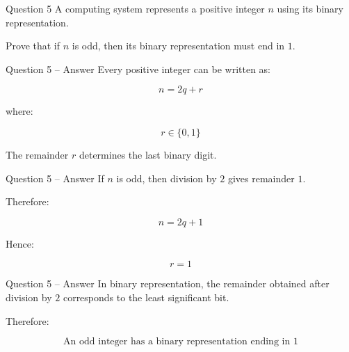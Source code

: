 \begin{frame}{Question 5}
A computing system represents a positive integer $n$ using its binary
representation.

Prove that if $n$ is odd, then its binary representation must end in $1$.
\end{frame}

\begin{frame}{Question 5 -- Answer}
Every positive integer can be written as:

$$
n=2q+r
$$

where:

$$
r\in\{0,1\}
$$

The remainder $r$ determines the last binary digit.
\end{frame}

\begin{frame}{Question 5 -- Answer}
If $n$ is odd, then division by $2$ gives remainder $1$.

Therefore:

$$
n=2q+1
$$

Hence:

$$
r=1
$$

\end{frame}

\begin{frame}{Question 5 -- Answer}
In binary representation, the remainder obtained after division by $2$
corresponds to the least significant bit.

Therefore:

$$
\boxed{\text{An odd integer has a binary representation ending in }1}
$$

\end{frame}
